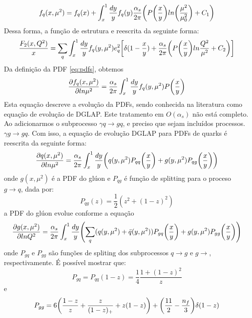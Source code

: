  \begin{equation}
     f_q(x, \mu^2) = f_ q (x) + \int^1_x \frac{dy}{y} f_q(y) \frac{\alpha_s}{2\pi} \qty(P\qty(\frac{x}{y}) ln\qty(\frac{\mu^2 }{\mu_0^2}) + C_1)
     \label{eq:pdfs}
 \end{equation}
 Dessa forma, a função de estrutura e reescrita da seguinte forma:
 \begin{equation}
     \frac{F_2(x,Q^2)}{x} = \sum_q  \int^1_x \frac{dy}{y} f_q(y, \mu^2) e_q^2  \qty[\delta(1-\frac{x}{y}) + \frac{\alpha_s}{2\pi}\qty(P\qty(\frac{x}{y})ln\frac{Q^2}{\mu^2} + C_2)]
     \label{eq:fedglap2}
 \end{equation}
 Da definição da PDF \eqref{eq:pdfs}, obtemos 
 \begin{equation}
     \pdv{f_q(x, \mu^2)}{ln\mu^2} = \frac{\alpha_s}{2\pi}\int^1_x \frac{dy}{y} f_q(y, \mu^2) P\qty(\frac{x}{y})
 \end{equation}
 Esta equação descreve a evolução da PDFs, sendo conhecida na literatura como equação de evolução de DGLAP. Este tratamento em  $O(\alpha_s)$ não está completo. Ao adicionarmos o subprocesso $\gamma q \rightarrow gq$, e preciso que sejam incluídos processos. $\gamma g \rightarrow gq$. Com isso, a equação de evolução DGLAP para PDFs de quarks é reescrita da seguinte forma:
 \begin{equation}
     \pdv{q(x, \mu^2)}{ln\mu^2} = \frac{\alpha_s}{2\pi}\int^1_x \frac{dy}{y}\qty(q(y, \mu^2) P_{qq}\qty(\frac{x}{y}) +  g(y, \mu^2) P_{qg}\qty(\frac{x}{y}) )
 \end{equation}
 onde $g(x,\mu^2)$ é a PDF do glúon e $P_{qg}$ é função de splitting para o proceso  $g\rightarrow q$, dada por:
 \begin{equation}
     P_{qg}(z) = \frac{1}{2}(z^2 + (1-z) ^2)
 \end{equation}
 a PDF do glúon evolue conforme a equação 
 \begin{equation}
     \pdv{g(x, \mu^2)}{lnQ^2} = \frac{\alpha_s}{2\pi}\int^1_x \frac{dy}{y}\qty(\sum_q(q(y, \mu^2) + \bar{q}(y, \mu^2)) P_{gq}\qty(\frac{x}{y}) +  g(y, \mu^2) P_{gg}\qty(\frac{x}{y}) )
 \end{equation}
 onde  $P_{gq}$ e $P_{gg}$ são funções de spliting dos subprocessos $q\rightarrow g$ e $g\rightarrow$, respectivamente. É possível mostrar que: 
 \begin{equation}
     P_{gq} = P_{qq}(1-z) = \frac{1}{4}\frac{1+(1-z)^2}{z}
 \end{equation}
 e
 \begin{equation}
     P_{gg} = 6\qty(\frac{1-z}{z} + \frac{z}{(1-z)_+} + z(1-z)) + \qty(\frac{11}{2} - \frac{n_f}{3})\delta(1-z)
 \end{equation}
